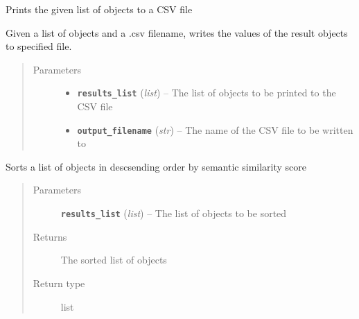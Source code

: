 \documentclass[letterpaper,10pt,english]{sphinxmanual}
\begin{document}
\begin{fulllineitems}
\label{wntest:semsim.wntest.output_results}
Prints the given list of  objects to a CSV file

Given a list of  objects and a .csv filename, writes the values of the result objects to specified file.
\begin{quote}\begin{description}
\item[{Parameters}] \leavevmode\begin{itemize}
\item {} 
\textbf{\texttt{results\_list}} (\emph{list}) -- The list of  objects to be printed to the CSV file

\item {} 
\textbf{\texttt{output\_filename}} (\emph{str}) -- The name of the CSV file to be written to

\end{itemize}

\end{description}\end{quote}

\end{fulllineitems}


\begin{fulllineitems}
\label{wntest:semsim.wntest.process_results}
Sorts a list of  objects in descsending order by semantic similarity score
\begin{quote}\begin{description}
\item[{Parameters}] \leavevmode
\textbf{\texttt{results\_list}} (\emph{list}) -- The list of  objects to be sorted

\item[{Returns}] \leavevmode
The sorted list of  objects

\item[{Return type}] \leavevmode
list

\end{description}\end{quote}

\end{fulllineitems}
\end{document}
